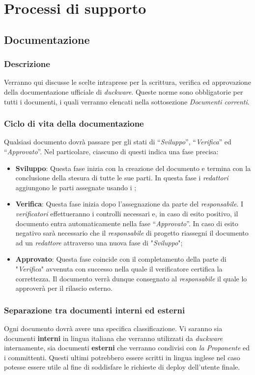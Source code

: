 \clearpage
\section{Processi di supporto}
\label{sec:proc_supp}
\subsection{Documentazione}
\label{sec:documentazione}
\subsubsection{Descrizione}
Verranno qui discusse le scelte intraprese per la scrittura, verifica ed approvazione della documentazione ufficiale di \emph{duckware}. Queste norme sono obbligatorie per tutti i documenti, i quali verranno elencati nella sottosezione \emph{Documenti correnti}.
\subsubsection{Ciclo di vita della documentazione}
Qualsiasi documento dovrà passare per gli stati di “\emph{Sviluppo}”, “\emph{Verifica}” ed “\emph{Approvato}”. Nel particolare, ciascuno di questi indica una fase precisa:
\begin{itemize}
    \item \textbf{Sviluppo}: Questa fase inizia con la creazione del documento e termina con la conclusione della stesura di tutte le sue parti. In questa fase i \emph{redattori} aggiungono le parti assegnate usando i ;
    \item \textbf{Verifica}: Questa fase inizia dopo l’assegnazione da parte del \emph{responsabile}. I \emph{verificatori} effettueranno i controlli necessari e, in caso di esito positivo, il documento entra automaticamente nella fase “\emph{Approvato}”. In caso di esito negativo sarà necessario che il \emph{responsabile} di progetto riassegni il documento ad un \emph{redattore} attraverso una nuova fase di "\emph{Sviluppo}";
    \item \textbf{Approvato}: Questa fase coincide con il completamento della parte di "\emph{Verifica}" avvenuta con successo nella quale il verificatore certifica la correttezza. Il documento verrà dunque consegnato al \emph{responsabile} il quale lo approverà per il rilascio esterno.
\end{itemize}

\subsubsection{Separazione tra documenti interni ed esterni}
Ogni documento dovrà avere una specifica classificazione. Vi saranno sia documenti \textbf{interni} in lingua italiana che verranno utilizzati da \emph{duckware} internamente, sia documenti \textbf{esterni} che verranno condivisi con \emph{la Proponente} ed i committenti. Questi ultimi potrebbero essere scritti in lingua inglese nel caso potesse essere utile al fine di soddisfare le richieste di deploy dell’utente finale.

